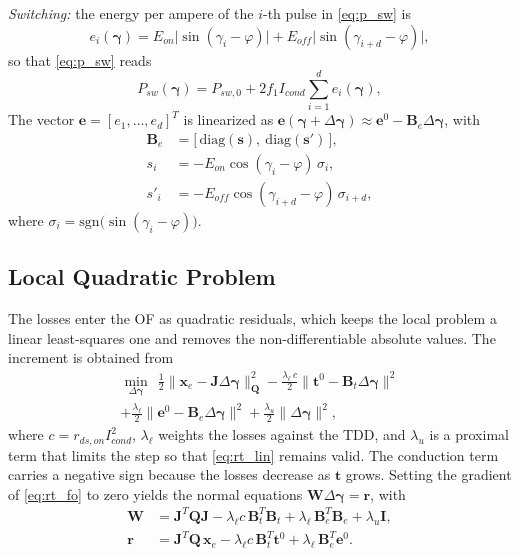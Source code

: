 \documentclass[conference]{IEEEtran}
\newcommand{\gv}{\boldsymbol{\gamma}}
\begin{document}
\textit{Switching:} the energy per ampere of the $i$-th pulse in
\eqref{eq:p_sw} is
%
\begin{equation}
  e_i(\gv) = E_{on}\big|\sin(\gamma_i-\varphi)\big|
           + E_{off}\big|\sin(\gamma_{i+d}-\varphi)\big|,
  \label{eq:rt_S}
\end{equation}
%
so that \eqref{eq:p_sw} reads
%
\begin{equation}
  P_{sw}(\gv) = P_{sw,0} + 2f_1 I_{cond}\sum_{i=1}^{d} e_i(\gv),
  \label{eq:rt_psw}
\end{equation}
%
The vector $\mathbf{e} = [e_1,\dots,e_d]^T$ is linearized as
$\mathbf{e}(\gv+\Delta\gv) \approx \mathbf{e}^0 - \mathbf{B}_e\Delta\gv$,
with
%
\begin{align}
  \mathbf{B}_e &= \big[\,\mathrm{diag}(\mathbf{s}),\
                  \mathrm{diag}(\mathbf{s}')\,\big], \nonumber\\
  s_i  &= -E_{on}\cos(\gamma_i-\varphi)\,\sigma_i, \nonumber\\
  s'_i &= -E_{off}\cos(\gamma_{i+d}-\varphi)\,\sigma_{i+d},
  \label{eq:rt_BS}
\end{align}
%
where $\sigma_i = \mathrm{sgn}\big(\sin(\gamma_i-\varphi)\big)$.

\subsection{Local Quadratic Problem}
\label{subsec:rt_fo}

The losses enter the OF as quadratic residuals, which keeps the local
problem a linear least-squares one and removes the non-differentiable
absolute values. The increment is obtained from
%
\begin{multline}
  \min_{\Delta\gv}\ \
  \frac{1}{2}\big\|\mathbf{x}_e - \mathbf{J}\Delta\gv\big\|_{\mathbf{Q}}^2
  - \frac{\lambda_{\ell}\,c}{2}\big\|\mathbf{t}^0 - \mathbf{B}_t\Delta\gv\big\|^2
  \\
  + \frac{\lambda_{\ell}}{2}\big\|\mathbf{e}^0 - \mathbf{B}_e\Delta\gv\big\|^2
  + \frac{\lambda_u}{2}\big\|\Delta\gv\big\|^2,
  \label{eq:rt_fo}
\end{multline}
%
where $c = r_{ds,on}I_{cond}^2$, $\lambda_{\ell}$ weights the losses
against the TDD, and $\lambda_u$ is a proximal term that limits the step so
that \eqref{eq:rt_lin} remains valid. The conduction term carries a
negative sign because the losses decrease as $\mathbf{t}$ grows. Setting
the gradient of \eqref{eq:rt_fo} to zero yields the normal equations
$\mathbf{W}\Delta\gv = \mathbf{r}$, with
%
\begin{align}
  \mathbf{W} &= \mathbf{J}^T\mathbf{Q}\mathbf{J}
    - \lambda_{\ell}c\,\mathbf{B}_t^T\mathbf{B}_t
    + \lambda_{\ell}\,\mathbf{B}_e^T\mathbf{B}_e + \lambda_u\mathbf{I},
  \nonumber\\
  \mathbf{r} &= \mathbf{J}^T\mathbf{Q}\,\mathbf{x}_e
    - \lambda_{\ell}c\,\mathbf{B}_t^T\mathbf{t}^0
    + \lambda_{\ell}\,\mathbf{B}_e^T\mathbf{e}^0.
  \label{eq:rt_W}
\end{align}
\end{document}
